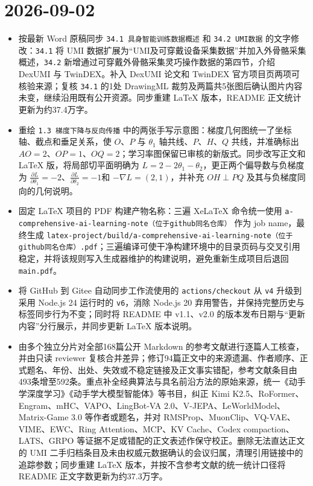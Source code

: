 \hypertarget{section-2}{%
\section{2026-09-02}\label{section-2}}

\begin{itemize}
\item
  按最新 Word 原稿同步 \texttt{34.1\ 具身智能训练数据概述} 和 \texttt{34.2\ UMI数据} 的文字修改：\texttt{34.1} 将 UMI 数据扩展为``UMI及可穿戴设备采集数据''并加入外骨骼采集概述，\texttt{34.2} 新增通过可穿戴外骨骼采集灵巧操作数据的第四节，介绍 DexUMI 与 TwinDEX。补入 DexUMI 论文和 TwinDEX 官方项目页两项可核验来源；复核 \texttt{34.1} 的1处 DrawingML 裁剪及两篇共5张图后确认图片内容未变，继续沿用既有公开资源。同步重建 LaTeX 版本，README 正文统计更新为约37.4万字。
\item
  重绘 \texttt{1.3\ 梯度下降与反向传播} 中的两张手写示意图：梯度几何图统一了坐标轴、截点和垂足关系，使 \(O\)、\(P\) 与 \(\theta_1\) 轴共线、\(P\)、\(H\)、\(Q\) 共线，并准确标出 \(AO=2\)、\(OP=1\)、\(OQ=2\)；学习率图保留已审核的新版式。同步改写正文和 LaTeX 版，将局部切平面明确为 \(L=2-2\theta_1-\theta_2\)，更正两个偏导数与负梯度为 \(\frac{\partial L}{\partial\theta_1}=-2\)、\(\frac{\partial L}{\partial\theta_2}=-1\)和 \(-\nabla L=(2,1)\)，并补充 \(OH\perp PQ\) 及其与负梯度同向的几何说明。
\item
  固定 LaTeX 项目的 PDF 构建产物名称：三遍 XeLaTeX 命令统一使用 \texttt{a-comprehensive-ai-learning-note（位于github同名仓库）} 作为 job name，最终生成 \texttt{latex-project/build/a-comprehensive-ai-learning-note（位于github同名仓库）.pdf}；三遍编译可使干净构建环境中的目录页码与交叉引用稳定，并将该规则写入生成器维护的构建说明，避免重新生成项目后退回 \texttt{main.pdf}。
\item
  将 GitHub 到 Gitee 自动同步工作流使用的 \texttt{actions/checkout} 从 \texttt{v4} 升级到采用 Node.js 24 运行时的 \texttt{v6}，消除 Node.js 20 弃用警告，并保持完整历史与标签同步行为不变；同时将 README 中 v1.1、v2.0 的版本发布日期与``更新内容''分行展示，并同步更新 LaTeX 版本说明。
\item
  由多个独立分片对全部168篇公开 Markdown 的参考文献进行逐篇人工核查，并由只读 reviewer 复核合并差异；修订94篇正文中的来源遗漏、作者顺序、正式题名、年份、出处、失效或不稳定链接及正文事实错配，参考文献条目由493条增至592条。重点补全经典算法与具名前沿方法的原始来源，统一《动手学深度学习》《动手学大模型智能体》等书目，纠正 Kimi K2.5、RoFormer、Engram、mHC、VAPO、LingBot-VA 2.0、V-JEPA、LeWorldModel、Matrix-Game 3.0 等作者或题名，并对 RMSProp、MuonClip、VQ-VAE、VIME、EWC、Ring Attention、MCP、KV Cache、Codex compaction、LATS、GRPO 等证据不足或错配的正文表述作保守校正。删除无法直达正文的 UMI 二手归档条目及未由权威元数据确认的会议归属，清理引用链接中的追踪参数；同步重建 LaTeX 版本，并按不含参考文献的统一统计口径将 README 正文字数更新为约37.3万字。

\end{itemize}
